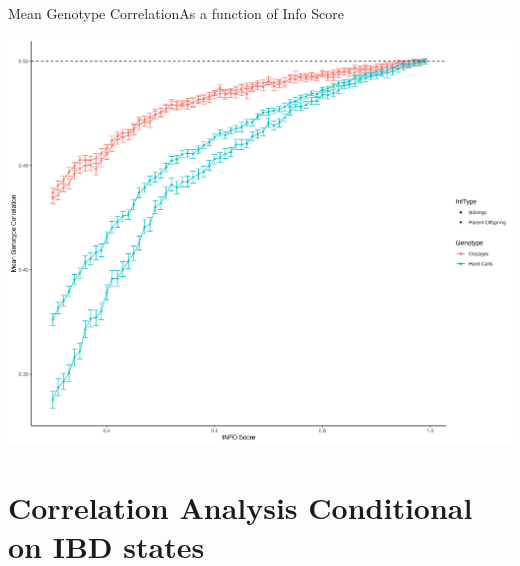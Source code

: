 \documentclass{beamer}
\begin{document}





\begin{frame}{Mean Genotype Correlation}{As a function of Info Score}

      \centering
      \includegraphics[width=.9\textwidth]{fig/mean_gt_corr_v2.png}
      
\end{frame}



\section{Correlation Analysis Conditional on IBD states}

\end{document}
